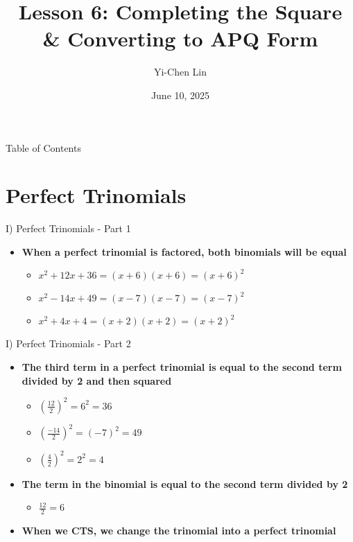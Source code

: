 \documentclass[aspectratio=169]{beamer}
\title{Lesson 6: Completing the Square \\& Converting to APQ Form}
\author{Yi-Chen Lin}
\date{June 10, 2025}
\begin{document}
\begin{frame}
    \titlepage
\end{frame}

\begin{frame}{Table of Contents}
    \tableofcontents
\end{frame}

\section{Perfect Trinomials}

\begin{frame}{I) Perfect Trinomials - Part 1}
    \begin{tcolorbox}[colback=lightgray,colframe=primary,title=Key Concepts]
        \footnotesize
        \begin{itemize}
            \item \textbf{When a perfect trinomial is factored, both binomials will be equal}
                \begin{itemize}
                    \item \(x^2 + 12x + 36 = (x+6)(x+6) = (x+6)^2\)
                    \item \(x^2 - 14x + 49 = (x-7)(x-7) = (x-7)^2\)
                    \item \(x^2 + 4x + 4 = (x+2)(x+2) = (x+2)^2\)
                \end{itemize}
        \end{itemize}
    \end{tcolorbox}
\end{frame}

\begin{frame}{I) Perfect Trinomials - Part 2}
    \begin{tcolorbox}[colback=lightgray,colframe=primary,title=Key Concepts (Cont.)]
        \footnotesize
        \begin{itemize}
            \item \textbf{The third term in a perfect trinomial is equal to the second term divided by 2 and then squared}
                \begin{itemize}
                    \item \(\left(\frac{12}{2}\right)^2 = 6^2 = 36\)
                    \item \(\left(\frac{-14}{2}\right)^2 = (-7)^2 = 49\)
                    \item \(\left(\frac{4}{2}\right)^2 = 2^2 = 4\)
                \end{itemize}
            \item \textbf{The term in the binomial is equal to the second term divided by 2}
                \begin{itemize}
                    \item \(\frac{12}{2} = 6\)
                \end{itemize}
            \item \textbf{When we CTS, we change the trinomial into a perfect trinomial}
        \end{itemize}
    \end{tcolorbox}
\end{frame}
\end{document}
